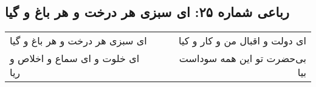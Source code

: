 \begin{center}
\section*{رباعی شماره ۲۵: ای سبزی هر درخت و هر باغ و گیا}
\label{sec:0025}
\begin{longtable}{l p{0.5cm} r}
ای سبزی هر درخت و هر باغ و گیا
&&
ای دولت و اقبال من و کار و کیا
\\
ای خلوت و ای سماع و اخلاص و ریا
&&
بی‌حضرت تو این همه سوداست بیا
\\
\end{longtable}
\end{center}

